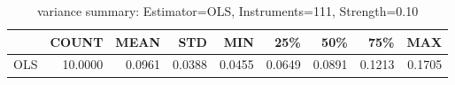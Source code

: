 \begin{table}[ht]
\centering
\caption{variance summary: Estimator=OLS, Instruments=111, Strength=0.10}
\begin{tabular}{lrrrrrrrr}
\toprule
 & COUNT & MEAN & STD & MIN & 25\% & 50\% & 75\% & MAX \\
\midrule
OLS & 10.0000 & 0.0961 & 0.0388 & 0.0455 & 0.0649 & 0.0891 & 0.1213 & 0.1705 \\
\bottomrule
\end{tabular}
\end{table}
